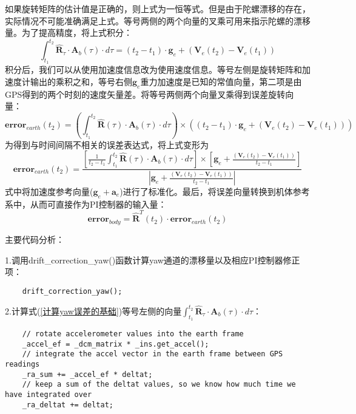 \documentclass[a4paper,10pt]{ctexart} %
\begin{document}
如果旋转矩阵的估计值是正确的，则上式为一恒等式。但是由于陀螺漂移的存在，实际情况不可能准确满足上式。等号两侧的两个向量的叉乘可用来指示陀螺的漂移量。为了提高精度，将上式积分：
\begin{equation}\label{计算yaw误差的基础}
\int_{t_1}^{t_2}{\hat{\mathbf{R}}_\tau\cdot\mathbf{A}_b(\tau)\cdot d\tau=(t_2-t_1)\cdot\mathbf{g}_e+(\mathbf{V}_e(t_2)-\mathbf{V}_e(t_1))}
\end{equation}
积分后，我们可以从使用加速度信息改为使用速度信息。等号左侧是旋转矩阵和加速度计输出的乘积之和，等号右侧$\mathbf{g}_e$重力加速度是已知的常值向量，第二项是由GPS得到的两个时刻的速度矢量差。将等号两侧两个向量叉乘得到误差旋转向量：
\begin{equation}
\mathbf{error}_{earth}(t_2)=\left(\int_{t_1}^{t_2}{\hat{\mathbf{R}}(\tau)\cdot\mathbf{A}_b(\tau)\cdot d\tau}\right)\times\left((t_2-t_1)\cdot\mathbf{g}_e+(\mathbf{V}_e(t_2)-\mathbf{V}_e(t_1))\right)
\end{equation}
为得到与时间间隔不相关的误差表达式，将上式变形为
\begin{equation}
\mathbf{error}_{earth}(t_2)=\frac{\left[\frac{1}{t_2-t_1}\int_{t_1}^{t_2}{\hat{\mathbf{R}}(\tau)\cdot\mathbf{A}_b(\tau)\cdot d\tau}\right]\times\left[\mathbf{g}_e+\frac{(\mathbf{V}_e(t_2)-\mathbf{V}_e(t_1))}{t_2-t_1}\right]}{\left|\mathbf{g}_e+\frac{(\mathbf{V}_e(t_2)-\mathbf{V}_e(t_1))}{t_2-t_1}\right|}
\end{equation}
式中将加速度参考向量($\mathbf{g}_e+\mathbf{a}_e$)进行了标准化。最后，将误差向量转换到机体参考系中，从而可直接作为PI控制器的输入量：
\begin{equation}
\mathbf{error}_{body}=\hat{\mathbf{R}}^T(t_2)\cdot\mathbf{error}_{earth}(t_2)
\end{equation}

\vspace{8pt}
\noindent 主要代码分析：

1.调用drift\_correction\_yaw()函数计算yaw通道的漂移量以及相应PI控制器修正项：
\begin{lstlisting}
    drift_correction_yaw();
\end{lstlisting}

2.计算式(\ref{计算yaw误差的基础})等号左侧的向量$\int_{t_1}^{t_2}{\hat{\mathbf{R}}_\tau\cdot\mathbf{A}_b(\tau)\cdot d\tau}$：
\begin{lstlisting}
    // rotate accelerometer values into the earth frame
    _accel_ef = _dcm_matrix * _ins.get_accel();
    // integrate the accel vector in the earth frame between GPS readings
    _ra_sum += _accel_ef * deltat;
    // keep a sum of the deltat values, so we know how much time we have integrated over
    _ra_deltat += deltat;
\end{lstlisting}
\end{document}
